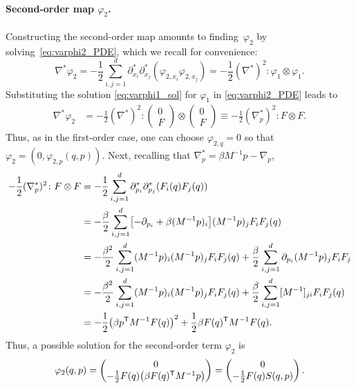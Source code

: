 \paragraph{Second-order map $\varphi_2$.} Constructing the second-order map amounts to finding~$\varphi_2$ by solving~\eqref{eq:varphi2_PDE}, which we recall for convenience:
%
\begin{equation}
	\nabla^*\varphi_2 = -\frac{1}{2}\sum_{i,j=1}^d \partial_{x_i}^*\partial_{x_j}^* (\varphi_{2,x_i}\varphi_{2,x_j}) = -\frac{1}{2}(\nabla^*)^2 \colon \varphi_1\otimes \varphi_1.
\end{equation}
%
Substituting the solution \eqref{eq:varphi1_sol} for $\varphi_1$ in \eqref{eq:varphi2_PDE} leads to
%
\begin{align}
    \nabla^*\varphi_2 &= -\frac{1}{2}(\nabla^*)^2\colon 
    \begin{pmatrix}
        0 \\ F    
    \end{pmatrix} \otimes 
    \begin{pmatrix}
        0 \\ F    
    \end{pmatrix} \equiv -\frac{1}{2}(\nabla_p^*)^2 \colon F\otimes F.
\end{align}
%
Thus, as in the first-order case, one can choose $\varphi_{2,q} = 0$ so that $\varphi_2 = (0, \varphi_{2,p}(q,p))$. Next, recalling that $\nabla^*_p = \beta M^{-1}p - \nabla_p$,
%
\begin{align}
    -\frac{1}{2}(\nabla_p^*)^2 \colon F\otimes F &= -\frac{1}{2}\sum_{i,j=1}^d \partial_{p_i}^*\partial_{p_j}^* \paren*{F_i(q)F_j(q)} \\
    &= -\frac{\beta}{2}\sum_{i,j=1}^d \bkt*{-\partial_{p_i} + \beta (M^{-1}p)_i}(M^{-1}p)_j F_iF_j(q) \\
    &= -\frac{\beta^2}{2}\sum_{i,j=1}^d (M^{-1}p)_i(M^{-1}p)_j F_iF_j(q) + \frac{\beta}{2} \sum_{i,j=1}^d \partial_{p_i}(M^{-1}p)_j F_iF_j \\
    &= -\frac{\beta^2}{2}\sum_{i,j=1}^d (M^{-1}p)_i(M^{-1}p)_j F_iF_j(q) +\frac{\beta}{2}\sum_{i,j=1}^d [M^{-1}]_{ji} F_iF_j(q) \\
    &= -\frac{1}{2}\paren*{\beta p^\t M^{-1}F(q)}^2 + \frac{1}{2}\beta F(q)^\t M^{-1}F(q).
\end{align}
%
Thus, a possible solution for the second-order term $\varphi_2$ is
%
\begin{equation}
    \varphi_2(q,p) = 
    \begin{pmatrix}
        0 \\ -\frac{1}{2}F(q)\paren*{\beta F(q)^\t M^{-1} p}
    \end{pmatrix} = 
    \begin{pmatrix}
        0 \\ -\frac{1}{2}F(q)S(q,p)
    \end{pmatrix}.
\end{equation}
